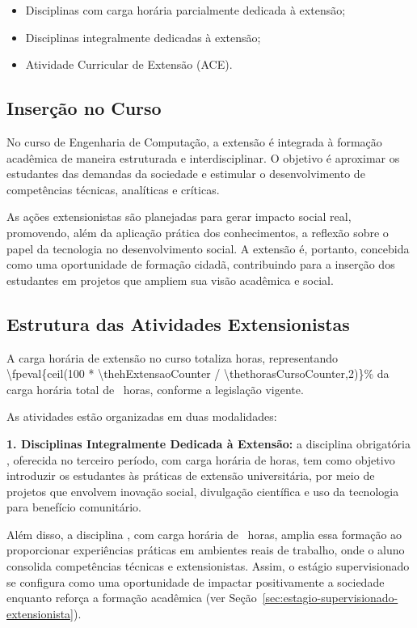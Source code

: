 \begin{itemize}
    \item Disciplinas com carga horária parcialmente dedicada à extensão;
    \item Disciplinas integralmente dedicadas à extensão;
    \item Atividade Curricular de Extensão (ACE).
\end{itemize}

\subsection{Inserção no Curso}

No curso de Engenharia de Computação, a extensão é integrada à formação acadêmica de maneira estruturada e interdisciplinar. O objetivo é aproximar os estudantes das demandas da sociedade e estimular o desenvolvimento de competências técnicas, analíticas e críticas.

As ações extensionistas são planejadas para gerar impacto social real, promovendo, além da aplicação prática dos conhecimentos, a reflexão sobre o papel da tecnologia no desenvolvimento social. A extensão é, portanto, concebida como uma oportunidade de formação cidadã, contribuindo para a inserção dos estudantes em projetos que ampliem sua visão acadêmica e social.

\subsection{Estrutura das Atividades Extensionistas}

A carga horária de extensão no curso totaliza \hExtensao horas, representando \num{\fpeval{ceil(100 * \thehExtensaoCounter / \thethorasCursoCounter,2)}}\% da carga horária total de \tHorasCurso\ horas, conforme a legislação vigente.

As atividades estão organizadas em duas modalidades:

\textbf{1. Disciplinas Integralmente Dedicada à Extensão:}
a disciplina obrigatória \textbf{\Ext}, oferecida no terceiro período, com carga horária de \ExtCH{ } horas, tem como objetivo introduzir os estudantes às práticas de extensão universitária, por meio de projetos que envolvem inovação social, divulgação científica e uso da tecnologia para benefício comunitário.

Além disso, a disciplina \textbf{\EstSup}, com carga horária de \EstSupCH~horas, amplia essa formação ao proporcionar experiências práticas em ambientes reais de trabalho, onde o aluno consolida competências técnicas e extensionistas. Assim, o estágio supervisionado se configura como uma oportunidade de impactar positivamente a sociedade enquanto reforça a formação acadêmica (ver Seção~\ref{sec:estagio-supervisionado-extensionista}).


